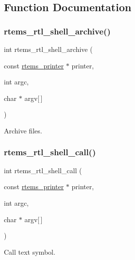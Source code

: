 \subsection{Function Documentation}
\mbox{\label{rtl-shell_8h_a6d62d1191b9362ec04fc2305eea21280}} 
\subsubsection{\texorpdfstring{rtems\_rtl\_shell\_archive()}{rtems\_rtl\_shell\_archive()}}
{\footnotesize\ttfamily int rtems\+\_\+rtl\+\_\+shell\+\_\+archive (\begin{DoxyParamCaption}\item[{const \mbox{\hyperlink{structrtems__printer}{rtems\+\_\+printer}} $\ast$}]{printer,  }\item[{int}]{argc,  }\item[{char $\ast$}]{argv\mbox{[}$\,$\mbox{]} }\end{DoxyParamCaption})}

Archive files. \mbox{\label{rtl-shell_8h_a80ea92b004f787087876764852d994fd}} 
\subsubsection{\texorpdfstring{rtems\_rtl\_shell\_call()}{rtems\_rtl\_shell\_call()}}
{\footnotesize\ttfamily int rtems\+\_\+rtl\+\_\+shell\+\_\+call (\begin{DoxyParamCaption}\item[{const \mbox{\hyperlink{structrtems__printer}{rtems\+\_\+printer}} $\ast$}]{printer,  }\item[{int}]{argc,  }\item[{char $\ast$}]{argv\mbox{[}$\,$\mbox{]} }\end{DoxyParamCaption})}

Call text symbol. \mbox{\label{rtl-shell_8h_aa548220d324834be6c5703605f7aa127}} 
